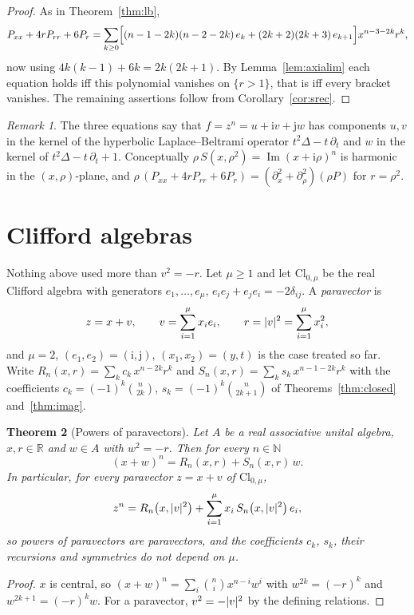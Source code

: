 \documentclass[11pt,a4paper]{article}
\newcommand{\ii}{\mathrm{i}}
\newcommand{\jj}{\mathrm{j}}
\newcommand{\R}{\mathbb{R}}
\newcommand{\N}{\mathbb{N}}
\DeclarePairedDelimiter{\abs}{\lvert}{\rvert}
\newtheorem{theorem}{Theorem}
\theoremstyle{remark}
\newtheorem{remark}[theorem]{Remark}
\begin{document}
\begin{proof}
As in Theorem~\ref{thm:lb},
\[
  P_{xx}+4rP_{rr}+6P_r
  =\sum_{k\ge 0}\Bigl[(n-1-2k)(n-2-2k)\,e_k+(2k+2)(2k+3)\,e_{k+1}\Bigr]x^{n-3-2k}r^k,
\]
now using $4k(k-1)+6k=2k(2k+1)$. By Lemma~\ref{lem:axialim} each equation holds iff this
polynomial vanishes on $\{r>1\}$, that is iff every bracket vanishes. The remaining assertions
follow from Corollary~\ref{cor:srec}.
\end{proof}

\begin{remark}
The three equations say that $f=z^n=u+\ii v+\jj w$ has components $u,v$ in the kernel of the
hyperbolic Laplace--Beltrami operator $t^2\Delta-t\,\partial_t$ and $w$ in the kernel of
$t^2\Delta-t\,\partial_t+1$. Conceptually $\rho\,S(x,\rho^2)=\operatorname{Im}(x+\ii\rho)^n$
is harmonic in the $(x,\rho)$-plane, and $\rho\,(P_{xx}+4rP_{rr}+6P_r)=(\partial_x^2+\partial_\rho^2)(\rho P)$
for $r=\rho^2$.
\end{remark}

\section{Clifford algebras}

Nothing above used more than $v^2=-r$. Let $\mu\ge 1$ and let $\mathrm{Cl}_{0,\mu}$ be the real
Clifford algebra with generators $e_1,\dots,e_\mu$, $e_ie_j+e_je_i=-2\delta_{ij}$. A
\emph{paravector} is
\[
  z=x+v,\qquad v=\sum_{i=1}^{\mu}x_ie_i,\qquad r=\abs{v}^2=\sum_{i=1}^{\mu}x_i^2 ,
\]
and $\mu=2$, $(e_1,e_2)=(\ii,\jj)$, $(x_1,x_2)=(y,t)$ is the case treated so far. Write
$R_n(x,r)=\sum_kc_k\,x^{n-2k}r^k$ and $S_n(x,r)=\sum_ks_k\,x^{n-1-2k}r^k$ with the
coefficients $c_k=(-1)^k\binom{n}{2k}$, $s_k=(-1)^k\binom{n}{2k+1}$ of
Theorems~\ref{thm:closed} and~\ref{thm:imag}.

\begin{theorem}[Powers of paravectors]\label{thm:clifford}
Let $A$ be a real associative unital algebra, $x,r\in\R$ and $w\in A$ with $w^2=-r$. Then for
every $n\in\N$
\[
  \boxed{\;(x+w)^n=R_n(x,r)+S_n(x,r)\,w.\;}
\]
In particular, for every paravector $z=x+v$ of $\mathrm{Cl}_{0,\mu}$,
\[
  z^n=R_n\bigl(x,\abs{v}^2\bigr)+\sum_{i=1}^{\mu}x_i\,S_n\bigl(x,\abs{v}^2\bigr)\,e_i ,
\]
so powers of paravectors are paravectors, and the coefficients $c_k$, $s_k$, their recursions
and symmetries do not depend on $\mu$.
\end{theorem}

\begin{proof}
$x$ is central, so $(x+w)^n=\sum_i\binom{n}{i}x^{n-i}w^i$ with $w^{2k}=(-r)^k$ and
$w^{2k+1}=(-r)^kw$. For a paravector, $v^2=-\abs{v}^2$ by the defining relations.
\end{proof}
\end{document}
